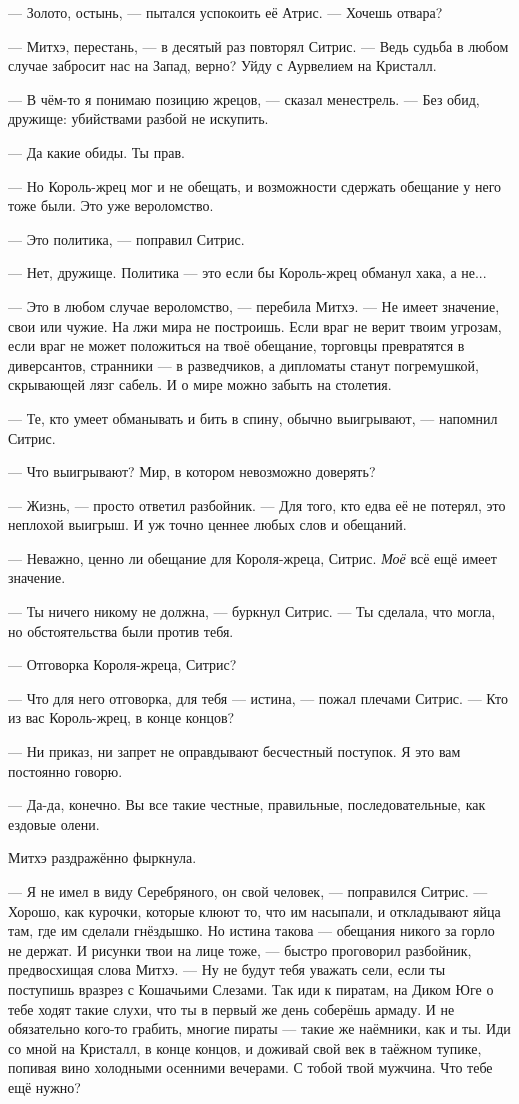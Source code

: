 --- Золото, остынь, --- пытался успокоить её Атрис.
--- Хочешь отвара?

--- Митхэ, перестань, --- в десятый раз повторял Ситрис.
--- Ведь судьба в любом случае забросит нас на Запад, верно?
Уйду с Аурвелием на Кристалл.

--- В чём-то я понимаю позицию жрецов, --- сказал менестрель.
--- Без обид, дружище: убийствами разбой не искупить.

--- Да какие обиды.
Ты прав.

--- Но Король-жрец мог и не обещать, и возможности сдержать обещание у него тоже были.
Это уже вероломство.

--- Это политика, --- поправил Ситрис.

--- Нет, дружище.
Политика --- это если бы Король-жрец обманул хака, а не...

--- Это в любом случае вероломство, --- перебила Митхэ.
--- Не имеет значение, свои или чужие.
На лжи мира не построишь.
Если враг не верит твоим угрозам, если враг не может положиться на твоё обещание, торговцы превратятся в диверсантов, странники --- в разведчиков, а дипломаты станут погремушкой, скрывающей лязг сабель.
И о мире можно забыть на столетия.

--- Те, кто умеет обманывать и бить в спину, обычно выигрывают, --- напомнил Ситрис.

--- Что выигрывают?
Мир, в котором невозможно доверять?

--- Жизнь, --- просто ответил разбойник.
--- Для того, кто едва её не потерял, это неплохой выигрыш.
И уж точно ценнее любых слов и обещаний.

--- Неважно, ценно ли обещание для Короля-жреца, Ситрис.
\emph{Моё} всё ещё имеет значение.

--- Ты ничего никому не должна, --- буркнул Ситрис.
--- Ты сделала, что могла, но обстоятельства были против тебя.

--- Отговорка Короля-жреца, Ситрис?

--- Что для него отговорка, для тебя --- истина, --- пожал плечами Ситрис.
--- Кто из вас Король-жрец, в конце концов?

--- Ни приказ, ни запрет не оправдывают бесчестный поступок.
Я это вам постоянно говорю.

--- Да-да, конечно.
Вы все такие честные, правильные, последовательные, как ездовые олени.

Митхэ раздражённо фыркнула.

--- Я не имел в виду Серебряного, он свой человек, --- поправился Ситрис.
--- Хорошо, как курочки, которые клюют то, что им насыпали, и откладывают яйца там, где им сделали гнёздышко.
Но истина такова --- обещания никого за горло не держат.
И рисунки твои на лице тоже, --- быстро проговорил разбойник, предвосхищая слова Митхэ.
--- Ну не будут тебя уважать сели, если ты поступишь вразрез с Кошачьими Слезами.
Так иди к пиратам, на Диком Юге о тебе ходят такие слухи, что ты в первый же день соберёшь армаду.
И не обязательно кого-то грабить, многие пираты --- такие же наёмники, как и ты.
Иди со мной на Кристалл, в конце концов, и доживай свой век в таёжном тупике, попивая вино холодными осенними вечерами.
С тобой твой мужчина.
Что тебе ещё нужно?

